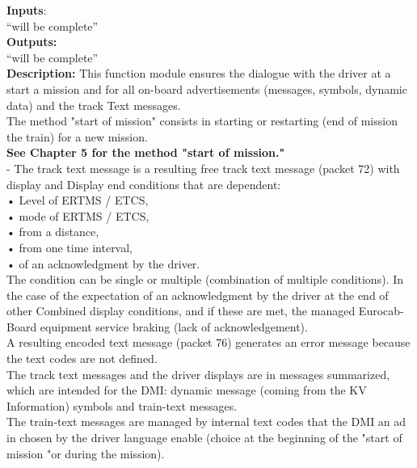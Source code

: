 \documentclass{template/openetcs_report}
\begin{document}
\textbf{Inputs}:\\
``will be complete''\\
 
 \textbf{Outputs:}\\
 ``will be complete''\\
 
 \textbf{Description:} 
This function module ensures the dialogue with the driver at a start 
a mission and for all on-board advertisements (messages, symbols, dynamic data) and the track 
Text messages. \\

The method "start of mission" consists in starting or restarting (end of mission 
the train) for a new mission. \\

\textbf{See Chapter 5 for the method "start of mission."} \\

- The track text message is a resulting free track text message (packet 72) with display and
Display end conditions that are dependent: \\
    • Level of ERTMS / ETCS, \\
    • mode of ERTMS / ETCS, \\
    • from a distance, \\
    • from one time interval, \\ 
    • of an acknowledgment by the driver. \\
The condition can be single or multiple (combination of multiple conditions). 
In the case of the expectation of an acknowledgment by the driver at the end of other 
Combined display conditions, and if these are met, the managed Eurocab- 
Board equipment service braking (lack of acknowledgement). \\

A resulting encoded text message (packet 76) generates an error message because the text codes 
are not defined. \\

The track text messages and the driver displays are in messages 
summarized, which are intended for the DMI: dynamic message (coming from the KV 
Information) symbols and train-text messages. \\

The train-text messages are managed by internal text codes that the DMI an ad in 
chosen by the driver language enable (choice at the beginning of the "start of 
mission "or during the mission).\\
\end{document}
